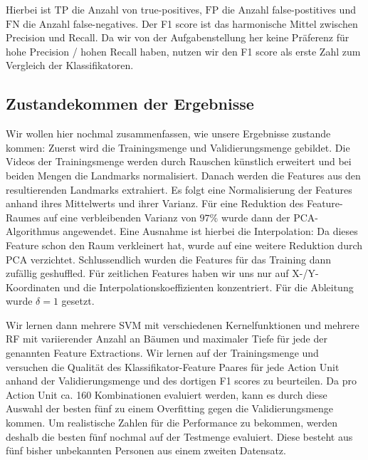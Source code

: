 Hierbei ist $\text{TP}$ die Anzahl von true-positives, $\text{FP}$ die Anzahl false-postitives und $\text{FN}$ die Anzahl false-negatives. Der F1 score ist das harmonische Mittel zwischen Precision und Recall. Da wir
von der Aufgabenstellung her keine Präferenz für hohe Precision / hohen Recall
haben, nutzen wir den F1 score als erste Zahl zum Vergleich der Klassifikatoren.

\subsection{Zustandekommen der Ergebnisse}
Wir wollen hier nochmal zusammenfassen, wie unsere Ergebnisse zustande kommen:
Zuerst wird die Trainingsmenge und Validierungsmenge gebildet.
Die Videos der Trainingsmenge werden durch Rauschen künstlich erweitert und bei beiden Mengen die Landmarks normalisiert.
Danach werden die Features aus den resultierenden Landmarks extrahiert.
Es folgt eine Normalisierung der Features anhand ihres Mittelwerts und ihrer Varianz.
Für eine Reduktion des Feature-Raumes auf eine verbleibenden Varianz von $97\%$ wurde dann der PCA-Algorithmus angewendet.
Eine Ausnahme ist hierbei die Interpolation: Da dieses Feature schon den Raum verkleinert hat, wurde auf eine weitere Reduktion durch PCA verzichtet.
Schlussendlich wurden die Features für das Training dann zufällig geshuffled. Für zeitlichen Features haben wir uns nur auf X-/Y-Koordinaten und die Interpolationskoeffizienten konzentriert. Für die Ableitung wurde $\delta=1$ gesetzt.

Wir lernen dann mehrere SVM mit verschiedenen Kernelfunktionen und mehrere RF
mit variierender Anzahl an Bäumen und maximaler Tiefe für jede der genannten
Feature Extractions. Wir lernen auf der Trainingsmenge und versuchen die Qualität
des Klassifikator-Feature Paares für jede Action Unit anhand der
Validierungsmenge und des dortigen F1 scores zu beurteilen. Da pro Action Unit
ca. 160 Kombinationen evaluiert werden, kann es durch diese Auswahl der besten
fünf zu einem Overfitting gegen die Validierungsmenge kommen. Um realistische
Zahlen für die Performance zu bekommen, werden deshalb die besten fünf nochmal
auf der Testmenge evaluiert. Diese besteht aus fünf bisher unbekannten
Personen aus einem zweiten Datensatz.


